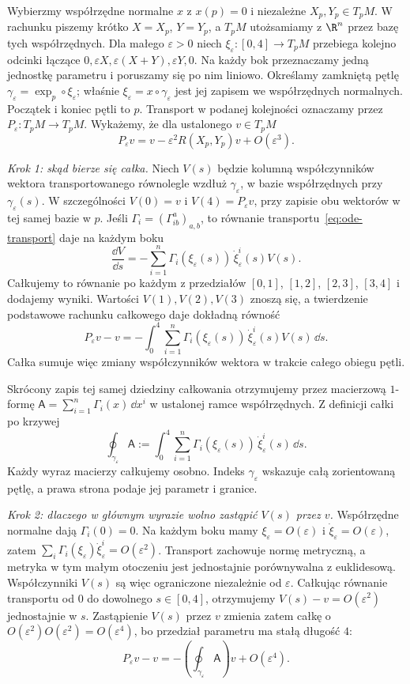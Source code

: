 \begin{uwaga}\label{uwaga:holonomia}
Wybierzmy współrzędne normalne $x$ z $x(p)=0$
i niezależne $X_p,Y_p\in T_pM$.
W rachunku piszemy krótko $X=X_p$, $Y=Y_p$,
a $T_pM$ utożsamiamy z $\R^n$ przez bazę tych współrzędnych.
Dla małego $\varepsilon>0$ niech
$\xi_\varepsilon:[0,4]\to T_pM$ przebiega kolejno
odcinki łączące
$0,\varepsilon X,\varepsilon(X+Y),\varepsilon Y,0$.
Na każdy bok przeznaczamy jedną jednostkę parametru
i poruszamy się po nim liniowo.
Określamy zamkniętą pętlę
$\gamma_\varepsilon=\exp_p\circ\xi_\varepsilon$;
właśnie $\xi_\varepsilon=x\circ\gamma_\varepsilon$
jest jej zapisem we współrzędnych normalnych.
Początek i koniec pętli to $p$.
Transport w podanej kolejności oznaczamy przez
$P_\varepsilon:T_pM\to T_pM$.
Wykażemy, że dla ustalonego $v\in T_pM$
\[
 P_\varepsilon v=v-\varepsilon^2R(X_p,Y_p)v+O(\varepsilon^3).
\]

\emph{Krok 1: skąd bierze się całka.}
Niech $V(s)$ będzie kolumną współczynników wektora
transportowanego równolegle wzdłuż $\gamma_\varepsilon$,
w bazie współrzędnych przy $\gamma_\varepsilon(s)$.
W szczególności $V(0)=v$ i $V(4)=P_\varepsilon v$,
przy zapisie obu wektorów w tej samej bazie w $p$.
Jeśli $\Gamma_i=(\Gamma^a_{ib})_{a,b}$, to równanie
transportu~\eqref{eq:ode-transport} daje na każdym boku
\[
 \frac{\dd V}{\dd s}
 =-\sum_{i=1}^n
       \Gamma_i(\xi_\varepsilon(s))\,\dot\xi_\varepsilon^i(s)V(s).
\]
Całkujemy to równanie po każdym z przedziałów
$[0,1]$, $[1,2]$, $[2,3]$, $[3,4]$ i dodajemy wyniki.
Wartości $V(1),V(2),V(3)$ znoszą się,
a twierdzenie podstawowe rachunku całkowego daje dokładną równość
\[
 P_\varepsilon v-v
 =-\int_0^4\sum_{i=1}^n
       \Gamma_i(\xi_\varepsilon(s))\,\dot\xi_\varepsilon^i(s)V(s)\,\dd s.
\]
Całka sumuje więc zmiany współczynników wektora
w trakcie całego obiegu pętli.

Skrócony zapis tej samej dziedziny całkowania
otrzymujemy przez macierzową $1$-formę
$\mathsf A=\sum_{i=1}^n\Gamma_i(x)\,\dd x^i$
w ustalonej ramce współrzędnych. Z definicji całki po krzywej
\[
 \oint_{\gamma_\varepsilon}\mathsf A
 :=\int_0^4\sum_{i=1}^n
       \Gamma_i(\xi_\varepsilon(s))\,\dot\xi_\varepsilon^i(s)\,\dd s.
\]
Każdy wyraz macierzy całkujemy osobno.
Indeks $\gamma_\varepsilon$ wskazuje całą zorientowaną pętlę,
a prawa strona podaje jej parametr i granice.

\emph{Krok 2: dlaczego w głównym wyrazie wolno zastąpić $V(s)$ przez $v$.}
Współrzędne normalne dają $\Gamma_i(0)=0$.
Na każdym boku mamy $\xi_\varepsilon=O(\varepsilon)$
i $\dot\xi_\varepsilon=O(\varepsilon)$, zatem
$\sum_i\Gamma_i(\xi_\varepsilon)\dot\xi_\varepsilon^i
=O(\varepsilon^2)$.
Transport zachowuje normę metryczną, a metryka w tym małym
otoczeniu jest jednostajnie porównywalna z euklidesową.
Współczynniki $V(s)$ są więc ograniczone niezależnie od $\varepsilon$.
Całkując równanie transportu od $0$ do dowolnego $s\in[0,4]$,
otrzymujemy $V(s)-v=O(\varepsilon^2)$ jednostajnie w $s$.
Zastąpienie $V(s)$ przez $v$ zmienia zatem całkę
o $O(\varepsilon^2)O(\varepsilon^2)=O(\varepsilon^4)$,
bo przedział parametru ma stałą długość $4$:
\[
 P_\varepsilon v-v
 =-\left(\oint_{\gamma_\varepsilon}\mathsf A\right)v
       +O(\varepsilon^4).
\]


\end{uwaga}
